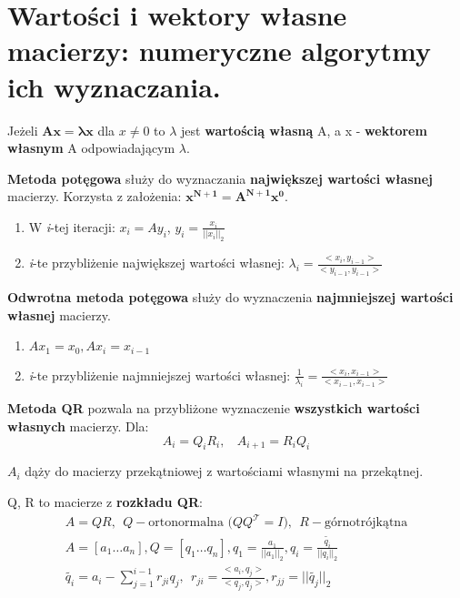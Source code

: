 \documentclass[main.tex]{subfiles}
\begin{document}
    \newpage


    \section{Wartości i wektory własne macierzy: numeryczne algorytmy ich wyznaczania.}
    \begin{definition}
        Jeżeli $\mathbf{Ax = \lambda x}$ dla $x \neq 0$ to $\lambda$ jest \textbf{wartością własną} A, a x -
        \textbf{wektorem własnym} A odpowiadającym $\lambda$.
    \end{definition}

    \begin{definition}
        \textbf{Metoda potęgowa} służy do wyznaczania \textbf{największej wartości własnej} macierzy. Korzysta z założenia:
        $\mathbf{x^{N+1} = A^{N+1} x^0}$.

        \begin{enumerate}
            \item W \textit{i}-tej iteracji: $x_i = Ay_i$, $y_i = \frac{x_i}{||x_i||_2}$
            \item \textit{i}-te przybliżenie największej wartości własnej: $\lambda_i = \frac{<x_i, y_{i-1}>}{<y_{i-1}, y_{i-1}>}$
        \end{enumerate}
    \end{definition}

    \begin{definition}
        \textbf{Odwrotna metoda potęgowa} służy do wyznaczenia \textbf{najmniejszej wartości własnej} macierzy.
        \begin{enumerate}
            \item $Ax_1 = x_0, Ax_i = x_{i-1}$
            \item \textit{i}-te przybliżenie najmniejszej wartości własnej: $\frac{1}{\lambda_i} = \frac{<x_i, x_{i-1}>}{<x_{i-1}, x_{i-1}>}$
        \end{enumerate}
    \end{definition}

    \begin{definition}
        \textbf{Metoda QR}  pozwala na przybliżone wyznaczenie \textbf{wszystkich wartości własnych} macierzy. Dla:
        \[A_i = Q_i R_i, ~~~~ A_{i+1} = R_i Q_i\]

        $A_i$ dąży do macierzy przekątniowej z wartościami własnymi na przekątnej.

        Q, R to macierze z \textbf{rozkładu QR}:
        \begin{gather*}
            A = QR, ~~ Q - \text{ortonormalna ($QQ^\mathcal{T}=I$)}, ~~ R - \text{górnotrójkątna}\\
            A = [a_1 \dots a_n], Q = [q_1 \dots q_n], q_1 = \frac{a_1}{||a_1||_2}, q_i = \frac{\tilde{q_i}}{||q_i||_2}\\
            \tilde{q_i} = a_i - \sum_{j=1}^{i-1} r_{ji} q_j, ~~ r_{ji} = \frac{<a_i, q_j>}{<q_j, q_j>}, r_{jj} = ||\tilde{q_j}||_2
        \end{gather*}
    \end{definition}
\end{document}
